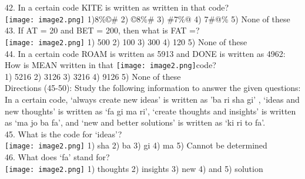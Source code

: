 \documentclass[
]{article}
\begin{document}
42. In a certain code KITE is written as %
written in that code?\\\texttt{[image: image2.png]}
1)8\%©\# 2) ©8\%\# \hspace{2mm}3) \#7\%@ \hspace{2mm}4) 7\#@\% \hspace{2mm}5) None of these\\

43. If AT = 20 and BET = 200, then what is FAT =?\\\texttt{[image: image2.png]}
1) 500 \hspace{2mm}2) 100 \hspace{2mm}3) 300 \hspace{2mm}4) 120 \hspace{2mm}5) None of these\\

44. In a certain code ROAM is written as 5913 and DONE is written as 4962: How is MEAN
written in that \texttt{[image: image2.png]}code?\\
1) 5216 \hspace{2mm}2) 3126 \hspace{2mm}3) 3216 \hspace{2mm}4) 9126 \hspace{2mm}5) None of these\\

Directions (45-50): Study the following information to answer the given questions:\\
In a certain code, ‘always create new ideas’ is written as ’ba ri sha gi’ , ‘ideas and new thoughts’
is written as ‘fa gi ma ri’, ‘create thoughts and insights’ is written as ‘ma jo ba fa’, and ‘new and
better solutions’ is written as ‘ki ri to fa’.\\

45. What is the code for ‘ideas’?\\
\texttt{[image: image2.png]}
1) sha \hspace{2mm}2) ba \hspace{2mm}3) gi \hspace{2mm}4) ma \hspace{2mm}5) Cannot be determined\\

46. What does ‘fa’ stand for?\\
\texttt{[image: image2.png]}
1) thoughts \hspace{2mm}2) insights \hspace{2mm}3) new \hspace{2mm}4) and \hspace{2mm}5) solution\\
\end{document}
